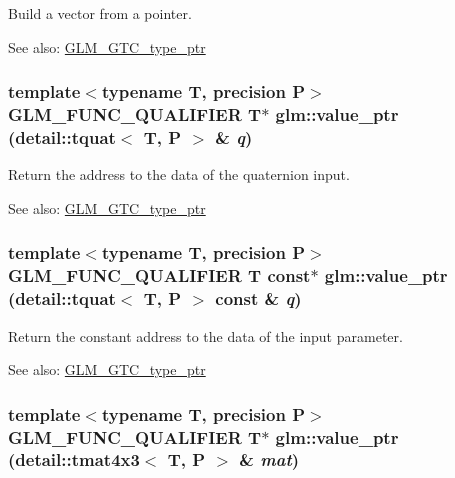 Build a vector from a pointer. \begin{Desc}
\item[See also:]\hyperlink{group__gtc__type__ptr}{GLM\_\-GTC\_\-type\_\-ptr} \end{Desc}
\hypertarget{group__gtc__type__ptr_ga84b8d637d0b816514e2db6ce19cec6c}{
\subsubsection[value\_\-ptr]{\setlength{\rightskip}{0pt plus 5cm}template$<$typename T, precision P$>$ GLM\_\-FUNC\_\-QUALIFIER T$\ast$ glm::value\_\-ptr (detail::tquat$<$ T, P $>$ \& {\em q})}}
\label{group__gtc__type__ptr_ga84b8d637d0b816514e2db6ce19cec6c}


Return the address to the data of the quaternion input. \begin{Desc}
\item[See also:]\hyperlink{group__gtc__type__ptr}{GLM\_\-GTC\_\-type\_\-ptr} \end{Desc}
\hypertarget{group__gtc__type__ptr_g06ca6cd0663b5a1ed1c217efc80013d8}{
\subsubsection[value\_\-ptr]{\setlength{\rightskip}{0pt plus 5cm}template$<$typename T, precision P$>$ GLM\_\-FUNC\_\-QUALIFIER T const$\ast$ glm::value\_\-ptr (detail::tquat$<$ T, P $>$ const \& {\em q})}}
\label{group__gtc__type__ptr_g06ca6cd0663b5a1ed1c217efc80013d8}


Return the constant address to the data of the input parameter. \begin{Desc}
\item[See also:]\hyperlink{group__gtc__type__ptr}{GLM\_\-GTC\_\-type\_\-ptr} \end{Desc}
\hypertarget{group__gtc__type__ptr_g1ba54cb6c4ff3c61c27f4883bddf6d31}{
\subsubsection[value\_\-ptr]{\setlength{\rightskip}{0pt plus 5cm}template$<$typename T, precision P$>$ GLM\_\-FUNC\_\-QUALIFIER T$\ast$ glm::value\_\-ptr (detail::tmat4x3$<$ T, P $>$ \& {\em mat})}}
\label{group__gtc__type__ptr_g1ba54cb6c4ff3c61c27f4883bddf6d31}


